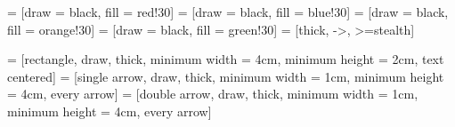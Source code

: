   = [draw = black, fill = red!30]
  = [draw = black, fill = blue!30]
  = [draw = black, fill = orange!30]
  = [draw = black, fill = green!30]
  = [thick, ->, >=stealth]

 = [rectangle, draw, thick, minimum width = 4cm, minimum height = 2cm, text centered]
 = [single arrow, draw, thick, minimum width = 1cm, minimum height = 4cm, every arrow]
 = [double arrow, draw, thick, minimum width = 1cm, minimum height = 4cm, every arrow]


\graphicspath{
	{./assets/figures/}
	{./assets/slides/}
	{./assets/icons/}
}


